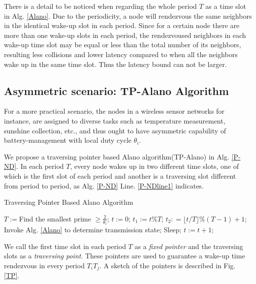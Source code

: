 There is a detail to be noticed when regarding the whole period $T$ as a time slot in Alg. \ref{Alano}. 
Due to the periodicity, a node will rendezvous the same neighbors in the identical wake-up slot in each period. 
Since for a certain node there are more than one wake-up slots in each period, 
the rendezvoused neighbors in each wake-up time slot may be equal or less than the total number of its neighbors,
resulting less collisions and lower latency compared to when all the neighbors wake up in the same time slot.
Thus the latency bound can not be larger.


\subsection{Asymmetric scenario: TP-Alano Algorithm}


For a more practical scenario, the nodes in a wireless sensor networks 
for instance, are assigned to diverse tasks such as temperature measurement,
sunshine collection, etc., and thus ought to have asymmetric capability of
battery-management with local duty cycle $\theta_i$.

We propose a traversing pointer based Alano algorithm(TP-Alano) in Alg. \ref{P-ND}.
In each period $T$, every node wakes up in two different time slots, one of which is the
first slot of each period and another is a traversing slot different from period to period, 
as Alg. \ref{P-ND} Line. \ref{P-NDline1} indicates. 

\begin{algorithm}[!h]
\caption{Traversing Pointer Based Alano Algorithm}
\label{P-ND}
\begin{algorithmic}[1]
\STATE $T := $Find the smallest prime $\geq \frac{2}{\theta_i}$;
\STATE $t := 0$;
	\STATE $t_1 := t \% T$;
	\STATE $t_2 : =\lfloor t / T \rfloor \% (T - 1) +1$;\label{P-NDline1}
    		\STATE Invoke Alg. \ref{Alano} to determine transmission state;
	\ELSE
    		\STATE Sleep;
	\ENDIF
	\STATE $t := t + 1$;
\ENDWHILE
\end{algorithmic}
\end{algorithm}

We call the first time slot in each period $T$ as a \emph{fixed pointer} and the traversing
slots as a \emph{traversing point}. These pointers are used to guarantee a wake-up time rendezvous
in every period $T_iT_j$. A sketch of the pointers is described in Fig. \ref{TP}.
 
